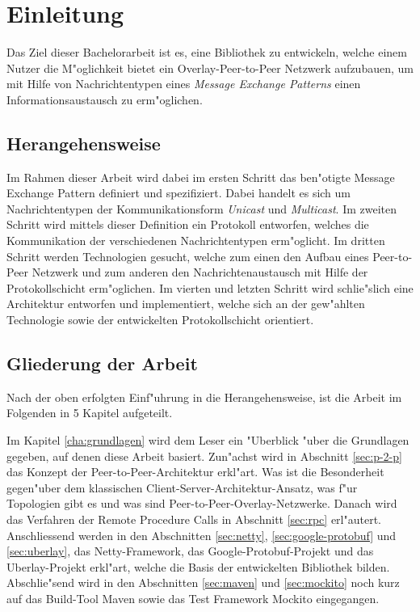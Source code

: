 \chapter{Einleitung}
\label{cha:einleitung}

Das Ziel dieser Bachelorarbeit ist es, eine Bibliothek zu entwickeln, welche einem Nutzer die M"oglichkeit bietet ein Overlay-Peer-to-Peer Netzwerk aufzubauen, um mit Hilfe von Nachrichtentypen eines \emph{Message Exchange Patterns} einen Informationsaustausch zu erm"oglichen.

\section{Herangehensweise}

Im Rahmen dieser Arbeit wird dabei im ersten Schritt das ben"otigte Message Exchange Pattern definiert und spezifiziert. Dabei handelt es sich um Nachrichtentypen der Kommunikationsform \emph{Unicast} und \emph{Multicast}. Im zweiten Schritt wird mittels dieser Definition ein Protokoll entworfen, welches die Kommunikation der verschiedenen Nachrichtentypen erm"oglicht. Im dritten Schritt werden Technologien gesucht, welche zum einen den Aufbau eines Peer-to-Peer Netzwerk und zum anderen den Nachrichtenaustausch mit Hilfe der Protokollschicht erm"oglichen. Im vierten und letzten Schritt wird schlie"slich eine Architektur entworfen und implementiert, welche sich an der gew"ahlten Technologie sowie der entwickelten Protokollschicht orientiert. 

\section{Gliederung der Arbeit}
Nach der oben erfolgten Einf"uhrung in die Herangehensweise, ist die Arbeit im Folgenden in 5 Kapitel aufgeteilt.

Im Kapitel \ref{cha:grundlagen} wird dem Leser ein "Uberblick "uber die Grundlagen gegeben, auf denen diese Arbeit basiert. Zun"achst wird in Abschnitt \ref{sec:p-2-p} das Konzept der Peer-to-Peer-Architektur erkl"art. Was ist die Besonderheit gegen"uber dem klassischen Client-Server-Architektur-Ansatz, was f"ur Topologien gibt es und was sind Peer-to-Peer-Overlay-Netzwerke. Danach wird das Verfahren der Remote Procedure Calls in Abschnitt \ref{sec:rpc} erl"autert. Anschliessend werden in den Abschnitten \ref{sec:netty}, \ref{sec:google-protobuf} und \ref{sec:uberlay}, das Netty-Framework, das Google-Protobuf-Projekt und das Uberlay-Projekt erkl"art, welche die Basis der entwickelten Bibliothek bilden. Abschlie"send wird in den Abschnitten \ref{sec:maven} und \ref{sec:mockito} noch kurz auf das Build-Tool Maven sowie das Test Framework Mockito eingegangen.

